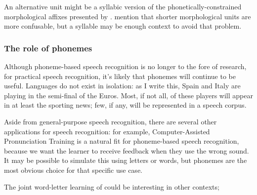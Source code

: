 \documentclass{article}[11pt]
\begin{document}
An alternative unit might be a syllabic version of the phonetically-constrained morphological affixes presented by \citet{huckvale_using_2002}. \citet{tachbelie_morpheme-based_2010} mention that shorter morphological units are more confusable, but a syllable may be enough context to avoid that problem.

\subsubsection{The role of phonemes}

Although phoneme-based speech recognition is no longer to the fore of research, for practical speech recognition, it's likely that phonemes will continue to be useful. Languages do not exist in isolation: as I write this, Spain and Italy are playing in the semi-final of the Euros. Most, if not all, of these players will appear in at least the sporting news; few, if any, will be represented in a speech corpus.

Aside from general-purpose speech recognition, there are several other applications for speech recognition: for example, Computer-Assisted Pronunciation Training is a natural fit for phoneme-based speech recognition, because we want the learner to receive feedback when they use the wrong sound. It may be possible to simulate this using letters or words, but phonemes are the most obvious choice for that specific use case.

The joint word-letter learning of \citet{li_acoustic--word_2017} could be interesting in other contexts;






%
\end{document}
